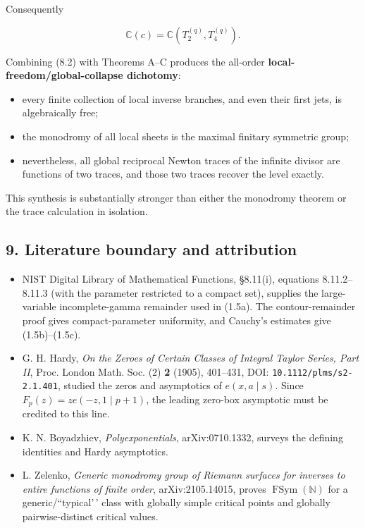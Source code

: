 Consequently

\[
 \mathbb C(c)=\mathbb C(T_2^{(q)},T_4^{(q)}).
\tag{Inv-8.2}
\]

Combining (8.2) with Theorems A--C produces the all-order
\textbf{local-freedom/global-collapse dichotomy}:

\begin{itemize}
\tightlist
\item
  every finite collection of local inverse branches, and even their first
  jets, is algebraically free;
\item
  the monodromy of all local sheets is the maximal finitary symmetric group;
\item
  nevertheless, all global reciprocal Newton traces of the infinite divisor
  are functions of two traces, and those two traces recover the level exactly.
\end{itemize}

This synthesis is substantially stronger than either the monodromy theorem or
the trace calculation in isolation.

\subsection{9. Literature boundary and attribution}

\begin{itemize}
\tightlist
\item
  NIST Digital Library of Mathematical Functions, \S8.11(i), equations
  8.11.2--8.11.3 (with the parameter restricted to a compact set), supplies
  the large-variable incomplete-gamma remainder used in (1.5a). The
  contour-remainder proof gives compact-parameter uniformity, and Cauchy's
  estimates give (1.5b)--(1.5c).
\item
  G. H. Hardy, \emph{On the Zeroes of Certain Classes of Integral Taylor
  Series, Part II}, Proc. London Math. Soc. (2) \textbf{2} (1905), 401--431,
  DOI: \texttt{10.1112/plms/s2-2.1.401}, studied the zeros and asymptotics of
  \(e(x,a\mid s)\). Since \(F_p(z)=z e(-z,1\mid p+1)\), the leading
  zero-box asymptotic must be credited to this line.
\item
  K. N. Boyadzhiev, \emph{Polyexponentials}, arXiv:0710.1332, surveys the
  defining identities and Hardy asymptotics.
\item
  L. Zelenko, \emph{Generic monodromy group of Riemann surfaces for inverses to
  entire functions of finite order}, arXiv:2105.14015, proves
  \(\operatorname{FSym}(\mathbb N)\) for a generic/``typical'\,' class with
  globally simple critical points and globally pairwise-distinct critical
  values.
\end{itemize}

